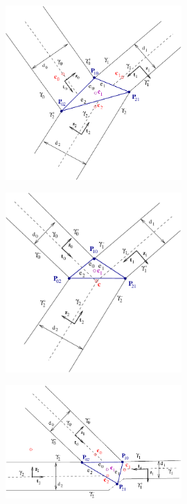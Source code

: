 \documentclass[11pt,a4paper,twoside]{article}
\begin{document}
\begin{figure}
\begin{center}
\includegraphics[width=0.6\textwidth]{Figure/biforc1}
\caption{\label{fig:biforc1}}
\end{center}
\end{figure}
\begin{figure}
\begin{center}
\includegraphics[width=0.6\textwidth]{Figure/biforc2}
\caption{\label{fig:biforc2}}
\end{center}
\end{figure}
\begin{figure}
\begin{center}
\includegraphics[width=0.6\textwidth]{Figure/tee}
\caption{\label{fig:tee}}
\end{center}
\end{figure}
\end{document}

